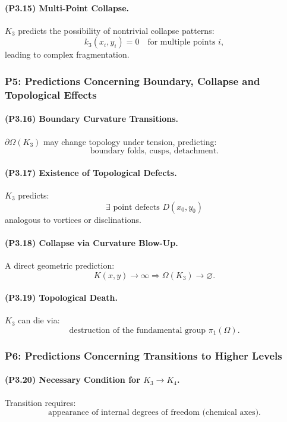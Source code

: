 \paragraph{(P3.15) Multi-Point Collapse.}
$K_3$ predicts the possibility of nontrivial collapse patterns:
\[
k_3(x_i,y_i) = 0 \quad \text{for multiple points } i,
\]
leading to complex fragmentation.

\subsubsection{P5: Predictions Concerning Boundary, Collapse and Topological Effects}

\paragraph{(P3.16) Boundary Curvature Transitions.}
$\partial\Omega(K_3)$ may change topology under tension, predicting:
\[
\text{boundary folds, cusps, detachment}.
\]

\paragraph{(P3.17) Existence of Topological Defects.}
$K_3$ predicts:
\[
\exists \text{ point defects } D(x_0,y_0)
\]
analogous to vortices or disclinations.

\paragraph{(P3.18) Collapse via Curvature Blow-Up.}
A direct geometric prediction:
\[
K(x,y) \to \infty \Rightarrow \Omega(K_3) \to \varnothing.
\]

\paragraph{(P3.19) Topological Death.}
$K_3$ can die via:
\[
\text{destruction of the fundamental group } \pi_1(\Omega).
\]

\subsubsection{P6: Predictions Concerning Transitions to Higher Levels}

\paragraph{(P3.20) Necessary Condition for \texorpdfstring{$K_3\to K_4$}{K_3\to K_4}.}
Transition requires:
\[
\text{appearance of internal degrees of freedom (chemical axes)}.
\]

